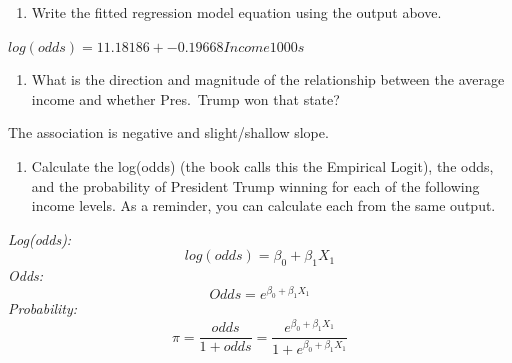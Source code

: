\documentclass[]{article}
\newenvironment{Shaded}{\begin{snugshade}}{\end{snugshade}}
\newcommand{\DataTypeTok}[1]{\textcolor[rgb]{0.13,0.29,0.53}{#1}}
\newcommand{\DecValTok}[1]{\textcolor[rgb]{0.00,0.00,0.81}{#1}}
\newcommand{\KeywordTok}[1]{\textcolor[rgb]{0.13,0.29,0.53}{\textbf{#1}}}
\newcommand{\NormalTok}[1]{#1}
\newcommand{\OperatorTok}[1]{\textcolor[rgb]{0.81,0.36,0.00}{\textbf{#1}}}
\newcommand{\StringTok}[1]{\textcolor[rgb]{0.31,0.60,0.02}{#1}}
\providecommand{\tightlist}{%
  \setlength{\itemsep}{0pt}\setlength{\parskip}{0pt}}
\begin{document}
\begin{enumerate}
\def\labelenumi{\arabic{enumi}.}
\setcounter{enumi}{2}
\tightlist
\item
  Write the fitted regression model equation using the output above.
\end{enumerate}

\(log(odds) = 11.18186+-0.19668 Income1000s\)

\begin{enumerate}
\def\labelenumi{\arabic{enumi}.}
\setcounter{enumi}{3}
\tightlist
\item
  What is the direction and magnitude of the relationship between the
  average income and whether Pres.~Trump won that state?
\end{enumerate}

The association is negative and slight/shallow slope.

\begin{enumerate}
\def\labelenumi{\arabic{enumi}.}
\setcounter{enumi}{4}
\tightlist
\item
  Calculate the log(odds) (the book calls this the Empirical Logit), the
  odds, and the probability of President Trump winning for each of the
  following income levels. As a reminder, you can calculate each from
  the same output.
\end{enumerate}

\emph{Log(odds):} \[log(odds) = \beta_0+\beta_1 X_1\] \emph{Odds:}
\[Odds = e^{\beta_0+\beta_1 X_1}\] \emph{Probability:}
\[\pi = \frac{odds}{1+odds} = \frac{e^{\beta_0+\beta_1 X_1}}{1+e^{\beta_0+\beta_1 X_1}}\]

\begin{Shaded}
\end{Shaded}
\end{document}
